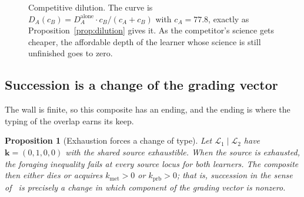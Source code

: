 \documentclass[11pt,a4paper]{article}
\theoremstyle{plain}
\newtheorem{proposition}[theorem]{Proposition}
\theoremstyle{definition}
\theoremstyle{remark}
\newcommand{\Lrn}{\mathcal{L}}
\begin{document}
\begin{figure}[t]
\centering
{}
\caption{Competitive dilution. The curve is $D_A(c_B) = D_A^{\text{alone}} \cdot
c_B/(c_A + c_B)$ with $c_A = 77.8$, exactly as Proposition~\ref{prop:dilution} gives it. As the
competitor's science gets cheaper, the affordable depth of the learner whose science is still
unfinished goes to zero.}
\label{fig:dilution}
\end{figure}

\subsection{Succession is a change of the grading vector}

The wall is finite, so this composite has an ending, and the ending is where the typing of the
overlap earns its keep.

\begin{proposition}[Exhaustion forces a change of type]\label{prop:succession}
Let $\Lrn_1 \mid \Lrn_2$ have $\mathbf{k} = (0,1,0,0)$ with the shared source exhaustible. When
the source is exhausted, the foraging inequality fails at every source locus for both learners.
The composite then either dies or acquires $k_{\mathrm{met}} > 0$ or $k_{\mathrm{prb}} > 0$;
that is, succession in the sense of~\cite[Prop.~45]{scientist} is precisely a change in which
component of the grading vector is nonzero.
\end{proposition}
\end{document}
